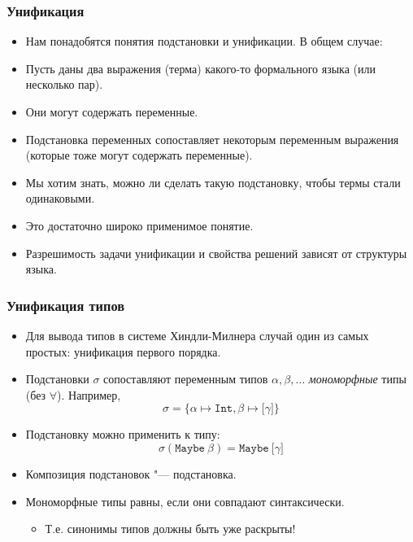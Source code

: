 \documentclass[11pt]{beamer}
\begin{document}
\begin{frame}[fragile]
  \frametitle{Унификация}
  \begin{itemize}
    \item Нам понадобятся понятия подстановки и унификации. В общем случае:
          \pause
    \item Пусть даны два выражения (терма) какого-то формального языка (или несколько пар).
    \item Они могут содержать переменные.
          \pause
    \item Подстановка переменных сопоставляет некоторым переменным выражения (которые тоже могут содержать переменные).
          \pause
    \item Мы хотим знать, можно ли сделать такую подстановку, чтобы термы стали одинаковыми.
          \pause
    \item Это достаточно широко применимое понятие.
          \pause
    \item Разрешимость задачи унификации и свойства решений зависят от структуры языка.
  \end{itemize}
\end{frame}

\begin{frame}[fragile]
  \frametitle{Унификация типов}
  \begin{itemize}
    \item Для вывода типов в системе Хиндли-Милнера случай один из самых простых: унификация первого порядка.
    \item Подстановки $\sigma$ сопоставляют переменным типов $\alpha, \beta, \ldots$ \emph{мономорфные} типы (без $\forall$). Например,
          \[ \sigma=\{\alpha \mapsto \mathtt{Int}, \beta \mapsto \mathtt{[}\gamma\mathtt{]} \} \]
    \item Подстановку можно применить к типу:
          \[ \sigma(\mathtt{Maybe}~\beta)=\mathtt{Maybe}~\mathtt{[}\gamma\mathtt{]} \]
    \item Композиция подстановок "--- подстановка.
    \item Мономорфные типы равны, если они совпадают синтаксически.
          \pause
          \begin{itemize}
            \item Т.е. синонимы типов должны быть уже раскрыты!
          \end{itemize}
  \end{itemize}
\end{frame}
\end{document}
